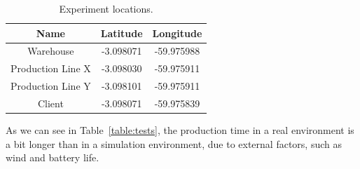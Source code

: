 \documentclass[12pt]{article}
\begin{document}
\begin{table}[H]
\centering
{}
\caption{Mission Flight Time Tested in Real and Virtual UAV.\label{table:tests}}
\end{table}

\begin{table}[H]
\centering
\begin{tabular}{|c|c|c|}
\hline
\bfseries Name & \bfseries Latitude & \bfseries Longitude \\
\hline
Warehouse & -3.098071 & -59.975988 \\
\hline
Production Line X & -3.098030 & -59.975911 \\
\hline
Production Line Y & -3.098101 & -59.975911 \\
\hline
Client & -3.098071 & -59.975839 \\
\hline
\end{tabular}
\caption{Experiment locations.}
\label{table:positions}
\end{table}

As we can see in Table~\ref{table:tests}, the production time in a real environment is a bit longer than in a simulation environment, due to external factors, such as wind and battery life.
\end{document}
